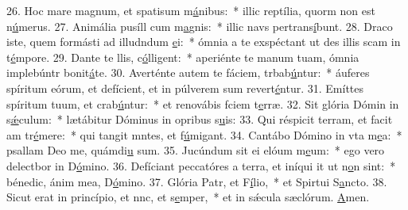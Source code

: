 26. Hoc mare magnum, et spatisum m\uline{á}nibus:~* illic reptília, quorm non est n\uline{ú}merus.
27. Animália pusíll cum m\uline{a}gnis:~* illic navs pertrans\uline{í}bunt.
28. Draco iste, quem formásti ad illudndum \uline{e}i:~* ómnia a te exspéctant ut des illis scam in t\uline{é}mpore.
29. Dante te llis, c\uline{ó}lligent:~* aperiénte te manum tuam, ómnia implebúntr bonit\uline{á}te.
30. Averténte autem te fáciem, trbab\uline{ú}ntur:~* áuferes spíritum eórum, et defícient, et in púlverem sum revert\uline{é}ntur.
31. Emíttes spíritum tuum, et crab\uline{ú}ntur:~* et renovábis fciem t\uline{e}rræ.
32. Sit glória Dómin in s\uline{ǽ}culum:~* lætábitur Dóminus in opribus s\uline{u}is:
33. Qui réspicit terram, et facit am tr\uline{é}mere:~* qui tangit mntes, et f\uline{ú}migant.
34. Cantábo Dómino in vta m\uline{e}a:~* psallam Deo me, quámdi\uline{u} sum.
35. Jucúndum sit ei elóum m\uline{e}um:~* ego vero delectbor in D\uline{ó}mino.
36. Defíciant peccatóres a terra, et iníqui it ut n\uline{o}n sint:~* bénedic, ánim mea, D\uline{ó}mino.
37. Glória Patr, et F\uline{í}lio,~* et Spirtui S\uline{a}ncto.
38. Sicut erat in princípio, et nnc, et s\uline{e}mper,~* et in sǽcula sæclórum. \uline{A}men.
